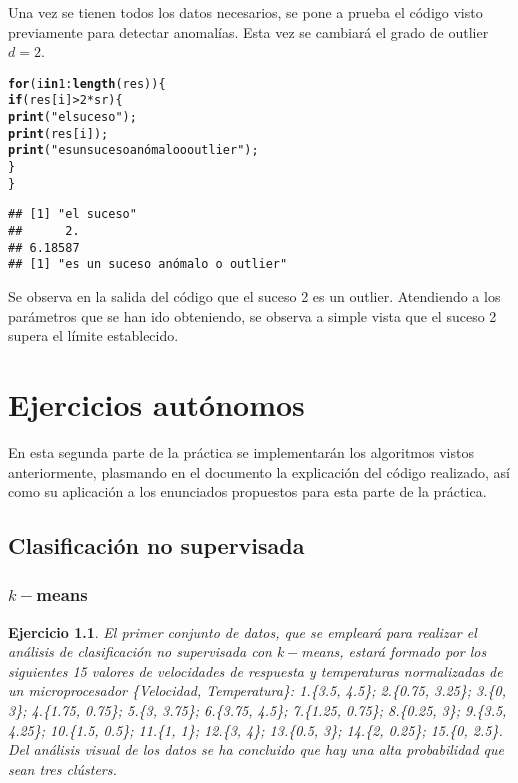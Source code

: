 \documentclass[12pt]{report}\usepackage[]{graphicx}\usepackage[dvipsnames]{xcolor}
\makeatletter
\newcommand{\hlnum}[1]{\textcolor[rgb]{0.686,0.059,0.569}{#1}}%
\newcommand{\hlstr}[1]{\textcolor[rgb]{0.192,0.494,0.8}{#1}}%
\newcommand{\hlopt}[1]{\textcolor[rgb]{0,0,0}{#1}}%
\newcommand{\hlstd}[1]{\textcolor[rgb]{0.345,0.345,0.345}{#1}}%
\newcommand{\hlkwa}[1]{\textcolor[rgb]{0.161,0.373,0.58}{\textbf{#1}}}%
\newcommand{\hlkwd}[1]{\textcolor[rgb]{0.737,0.353,0.396}{\textbf{#1}}}%
\newenvironment{kframe}{%
 \def\at@end@of@kframe{}%
 \ifinner\ifhmode%
  \def\at@end@of@kframe{\end{minipage}}%
  \begin{minipage}{\columnwidth}%
 \fi\fi%
 \def\FrameCommand##1{\hskip\@totalleftmargin \hskip-\fboxsep
 \colorbox{shadecolor}{##1}\hskip-\fboxsep
     \hskip-\linewidth \hskip-\@totalleftmargin \hskip\columnwidth}%
 \MakeFramed {\advance\hsize-\width
   \@totalleftmargin\z@ \linewidth\hsize
   \@setminipage}}%
 {\par\unskip\endMakeFramed%
 \at@end@of@kframe}
\newenvironment{knitrout}{}{} %
\newtheorem{exercise}{Ejercicio}[section]
\makeatother
\begin{document}
			 Una vez se tienen todos los datos necesarios, se pone a prueba el código visto previamente para detectar anomalías. Esta vez se cambiará el grado de outlier $d = 2$.
			 
\begin{knitrout}
\color{fgcolor}\begin{kframe}
\begin{alltt}
\hlkwa{for} \hlstd{(i} \hlkwa{in} \hlnum{1}\hlopt{:}\hlkwd{length}\hlstd{(res))\{}
        \hlkwa{if}\hlstd{(res[i]}\hlopt{>}\hlnum{2}\hlopt{*}\hlstd{sr)\{}
                \hlkwd{print}\hlstd{(}\hlstr{"el suceso"}\hlstd{);}
                \hlkwd{print}\hlstd{(res[i]);}
                \hlkwd{print}\hlstd{(}\hlstr{"es un suceso anómalo o outlier"}\hlstd{);}
                                 \hlstd{\}}
\hlstd{\}}
\end{alltt}
\begin{verbatim}
## [1] "el suceso"
##      2. 
## 6.18587 
## [1] "es un suceso anómalo o outlier"
\end{verbatim}
\end{kframe}
\end{knitrout}
			 
			 Se observa en la salida del código que el suceso 2 es un outlier. Atendiendo a los parámetros que se han ido obteniendo, se observa a simple vista que el suceso 2 supera el límite establecido. 
	 
	 \chapter{Ejercicios autónomos}
	 
		 En esta segunda parte de la práctica se implementarán los algoritmos vistos anteriormente, plasmando en el documento la explicación del código realizado, así como su aplicación a los enunciados propuestos para esta parte de la práctica.
		 
		 \section{Clasificación no supervisada}
		 
		 	\subsection{$k-$means}
		 
				 \begin{exercise}
					 	El primer conjunto de datos, que se empleará para realizar el análisis de clasificación no supervisada con $k-$means, estará formado por los siguientes 15 valores de velocidades de respuesta y temperaturas normalizadas de un microprocesador \{Velocidad, Temperatura\}: 1.\{3.5, 4.5\}; 2.\{0.75, 3.25\}; 3.\{0, 3\}; 4.\{1.75, 0.75\}; 5.\{3, 3.75\}; 6.\{3.75, 4.5\}; 7.\{1.25, 0.75\}; 8.\{0.25, 3\}; 9.\{3.5, 4.25\}; 10.\{1.5, 0.5\}; 11.\{1, 1\}; 12.\{3, 4\}; 13.\{0.5, 3\}; 14.\{2, 0.25\}; 15.\{0, 2.5\}. Del análisis visual de los datos se ha concluido que hay una alta probabilidad que sean tres clústers.
				 \end{exercise}
				 
\end{document}
